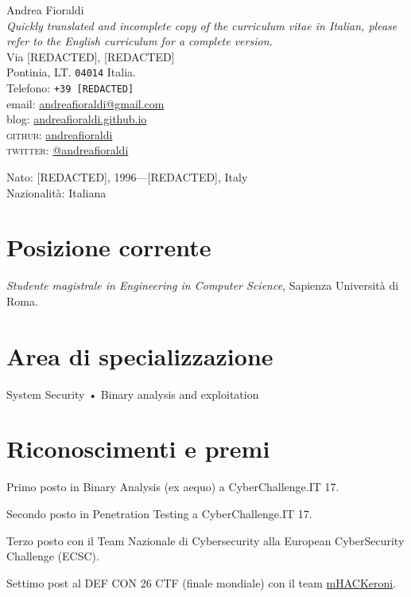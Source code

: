 \documentclass[10pt, a4paper]{article}
\newcommand{\years}[1]{\marginnote{\scriptsize #1}}
\begin{document}
{\LARGE Andrea Fioraldi}\\[1cm]
{\em Quickly translated and incomplete copy of the curriculum vitae in Italian, please refer to the English curriculum for a complete version.} \\[0.4cm]
 Via [REDACTED], [REDACTED]\\
Pontinia, LT. \texttt{04014}
Italia.\\[.2cm]
Telefono: \texttt{+39 [REDACTED]}\\[.2cm]
email: \href{mailto:andreafioraldi@gmail.com}{andreafioraldi@gmail.com}\\
blog: \href{https://andreafioraldi.github.io}{andreafioraldi.github.io}\\
\textsc{github}: \href{https://github.com/andreafioraldi}{andreafioraldi}\\ 
\textsc{twitter}: \href{https://twitter.com/andreafioraldi}{@andreafioraldi}\\

\par\vspace{1cm}

Nato:  [REDACTED], 1996---[REDACTED], Italy\\
Nazionalità:  Italiana

\section*{Posizione corrente}
\emph{Studente magistrale in Engineering in Computer Science}, Sapienza Università di Roma.

\section*{Area di specializzazione}
 System Security • Binary analysis and exploitation

\section*{Riconoscimenti e premi}
\noindent
\years{2017}Primo posto in Binary Analysis (ex aequo) a CyberChallenge.IT 17.

\years{2017}Secondo posto in Penetration Testing a CyberChallenge.IT 17.

\years{2017}Terzo posto con il Team Nazionale di Cybersecurity alla European CyberSecurity Challenge (ECSC).

\years{2018}Settimo post al DEF CON 26 CTF (finale mondiale) con il team \href{https://mhackeroni.it}{mHACKeroni}.
\end{document}
